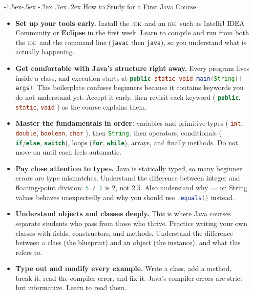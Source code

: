 \documentclass[12pt,twocolumn]{amsart}
\makeatletter
\newcommand{\JDK}{\textsc{jdk}}
\newcommand{\IDE}{\textsc{ide}}
\newcommand{\code}[1]{\lstinline[language=Java]{#1}}
\renewcommand\section{\@startsection{section}{1}%
  \z@
  {-1.5ex\@plus -.5ex \@minus -.2ex}%
  {.7ex \@plus .2ex}%
  {\normalfont\large\bfseries}}
\makeatother
\begin{document}
\section{How to Study for a First Java Course}

	
\begin{itemize}

	\item
	\textbf{Set up your tools early.} 
	Install the \JDK\ and an \IDE\ such as IntelliJ IDEA Community or \textbf{Eclipse} in the first week. 
	Learn to compile and run from both the \IDE\ and the command line 
	(\code{javac} then \code{java}), 
	so you understand what is actually happening.
	
	\item
	\textbf{Get comfortable with Java’s structure right away.} 
	Every program lives inside a class, and execution starts at 
	\code{public static void main(String[] args)}. 
	This boilerplate confuses beginners because it contains keywords you do not understand yet. 
	Accept it early, then revisit each keyword (
	\code{public}, 
	\code{static}, 
	\code{void}
	) as the course explains them.
	
	\item
	\textbf{Master the fundamentals in order:} 
	variables and primitive types (
	\code{int}, 
	\code{double}, 
	\code{boolean}, 
	\code{char}
	), then 
	\code{String}, then operators, 
	conditionals (
	\code{if}/\code{else}, 
	\code{switch}), 
	loops (\code{for}, \code{while}), 
	arrays, and finally methods. 
	Do not move on until each feels automatic.
	
	\item
	\textbf{Pay close attention to types.} 
	Java is statically typed, so many beginner errors are type mismatches. 
	Understand the difference between integer and floating-point division: 
	\code{5 / 2} is 2, not 2.5. 
	Also understand why \code{==} on String values behaves unexpectedly and 
	why you should use 
	\code{.equals()} instead.
	
	\item
	\textbf{Understand objects and classes deeply.} 
	This is where Java courses separate students who pass from those who thrive. 
	Practice writing your own classes with fields, constructors, and methods. 
	Understand the difference between a class (the blueprint) and an object (the instance), and 
	what this refers to.
	
	\item
	\textbf{Type out and modify every example.} 
	Write a class, add a method, break it, read the compiler error, and fix it. 
	Java’s compiler errors are strict but informative. Learn to read them.
	

\end{itemize}
\end{document}
